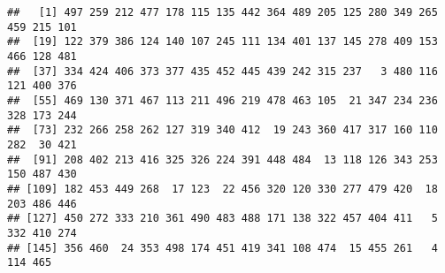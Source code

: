 \documentclass[
]{article}
\newenvironment{Shaded}{\begin{snugshade}}{\end{snugshade}}
\newcommand{\FunctionTok}[1]{\textcolor[rgb]{0.00,0.00,0.00}{#1}}
\newcommand{\NormalTok}[1]{#1}
\newcommand{\SpecialCharTok}[1]{\textcolor[rgb]{0.00,0.00,0.00}{#1}}
\begin{document}
\begin{Shaded}
\end{Shaded}

\begin{verbatim}
##   [1] 497 259 212 477 178 115 135 442 364 489 205 125 280 349 265 459 215 101
##  [19] 122 379 386 124 140 107 245 111 134 401 137 145 278 409 153 466 128 481
##  [37] 334 424 406 373 377 435 452 445 439 242 315 237   3 480 116 121 400 376
##  [55] 469 130 371 467 113 211 496 219 478 463 105  21 347 234 236 328 173 244
##  [73] 232 266 258 262 127 319 340 412  19 243 360 417 317 160 110 282  30 421
##  [91] 208 402 213 416 325 326 224 391 448 484  13 118 126 343 253 150 487 430
## [109] 182 453 449 268  17 123  22 456 320 120 330 277 479 420  18 203 486 446
## [127] 450 272 333 210 361 490 483 488 171 138 322 457 404 411   5 332 410 274
## [145] 356 460  24 353 498 174 451 419 341 108 474  15 455 261   4 114 465
\end{verbatim}
\end{document}
